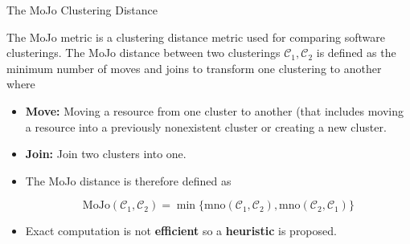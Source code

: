 \documentclass{beamer}
\begin{document}
\begin{frame}{The MoJo Clustering Distance}

The MoJo \cite{mojo} metric is a clustering distance metric used for comparing software clusterings. The MoJo distance between two clusterings $\mathcal C_1, \mathcal C_2$ is defined as the minimum number of moves and joins to transform one clustering to another where 
\begin{itemize}
    \item<1-> \textbf{Move:} Moving a resource from one cluster to another (that includes moving a resource into a previously nonexistent cluster or creating a new cluster.
    \item<2-> \textbf{Join:} Join two clusters into one.
	\item<3-> The MoJo distance is therefore defined as 

$$\textrm{MoJo} (\mathcal C_1, \mathcal C_2) = \min \{ \textrm{mno} (\mathcal C_1, \mathcal C_2), \textrm{mno}(\mathcal C_2, \mathcal C_1) \}$$
    \item<4-> Exact computation is not \textbf{efficient} so a \textbf{heuristic} is proposed.


\end{itemize}

\end{frame}
\end{document}
